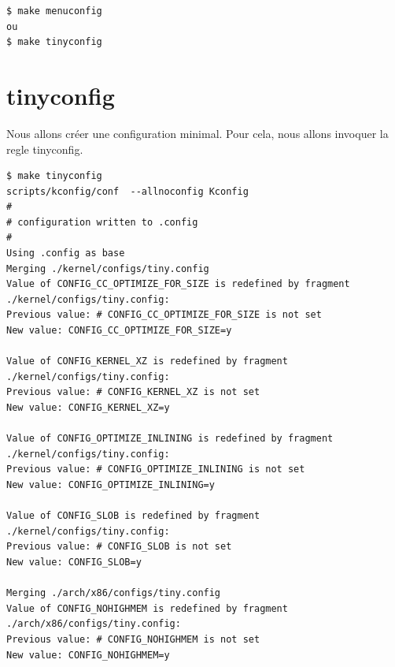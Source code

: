 \documentclass[a4paper]{article}
\begin{document}
\begin{verbatim}
$ make menuconfig
ou
$ make tinyconfig
\end{verbatim}

\section{tinyconfig}

Nous allons créer une configuration minimal. Pour cela, nous allons invoquer la regle tinyconfig.

\begin{verbatim}
$ make tinyconfig
scripts/kconfig/conf  --allnoconfig Kconfig
#
# configuration written to .config
#
Using .config as base
Merging ./kernel/configs/tiny.config
Value of CONFIG_CC_OPTIMIZE_FOR_SIZE is redefined by fragment ./kernel/configs/tiny.config:
Previous value: # CONFIG_CC_OPTIMIZE_FOR_SIZE is not set
New value: CONFIG_CC_OPTIMIZE_FOR_SIZE=y

Value of CONFIG_KERNEL_XZ is redefined by fragment ./kernel/configs/tiny.config:
Previous value: # CONFIG_KERNEL_XZ is not set
New value: CONFIG_KERNEL_XZ=y

Value of CONFIG_OPTIMIZE_INLINING is redefined by fragment ./kernel/configs/tiny.config:
Previous value: # CONFIG_OPTIMIZE_INLINING is not set
New value: CONFIG_OPTIMIZE_INLINING=y

Value of CONFIG_SLOB is redefined by fragment ./kernel/configs/tiny.config:
Previous value: # CONFIG_SLOB is not set
New value: CONFIG_SLOB=y

Merging ./arch/x86/configs/tiny.config
Value of CONFIG_NOHIGHMEM is redefined by fragment ./arch/x86/configs/tiny.config:
Previous value: # CONFIG_NOHIGHMEM is not set
New value: CONFIG_NOHIGHMEM=y


\end{verbatim}
\end{document}
